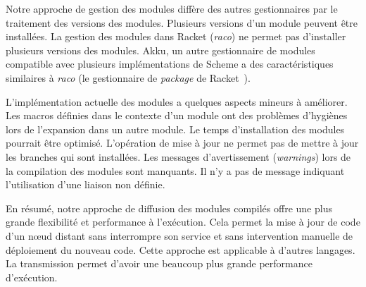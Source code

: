 Notre approche de gestion des modules diffère des autres gestionnaires par le
traitement des versions des modules. Plusieurs versions d'un module peuvent
être installées. La gestion des modules dans Racket (\textit{raco}) ne permet
pas d'installer plusieurs versions des modules. Akku, un autre gestionnaire de
modules compatible avec plusieurs implémentations de Scheme a des
caractéristiques similaires à \textit{raco} (le gestionnaire de
\textit{package} de Racket~\cite{Racket}).

L'implémentation actuelle des modules a quelques aspects mineurs à améliorer.
Les macros définies dans le contexte d'un module ont des problèmes d'hygiènes
lors de l'expansion dans un autre module. Le temps d'installation des modules
pourrait être optimisé. L'opération de mise à jour ne permet pas de mettre à jour
les branches qui sont installées.  Les messages d'avertissement
(\textit{warnings}) lors de la compilation des modules sont manquants. Il n'y a
pas de message indiquant l'utilisation d'une liaison non définie.


En résumé, notre approche de diffusion des modules compilés offre une
plus grande flexibilité et performance à l'exécution. Cela permet la mise à jour de
code d'un nœud distant sans interrompre son service et sans intervention
manuelle de déploiement du nouveau code. Cette approche
est applicable à d'autres langages. La transmission permet d'avoir
une beaucoup plus grande performance d'exécution.


